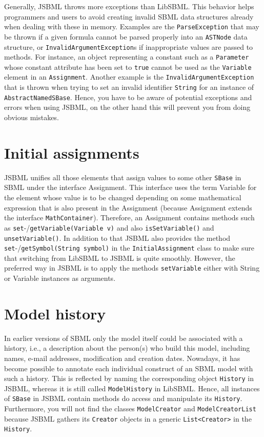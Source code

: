 \documentclass[
  BCOR12mm,
  letterpaper,
  11pt,
  headsepline,
  pointlessnumbers,
  tablecaptionabove,
  headinclude,
  appendixprefix,
  idxtotoc,
  bibtotoc,
  twoside,
  titlepage
]{scrartcl}
\begin{document}
Generally, JSBML throws more exceptions than LibSBML. This behavior helps
programmers and users to avoid creating invalid SBML data structures already
when dealing with these in memory. Examples are the \verb!ParseException! that
may be thrown if a given formula cannot be parsed properly into an
\verb!ASTNode! data structure, or \verb!InvalidArgumentException!s if
inappropriate values are passed to methods. For instance, an object representing
a constant such as a \verb!Parameter! whose constant attribute has been set to
\verb!true! cannot be used as the \verb!Variable! element in an
\verb!Assignment!. Another example is the \verb!InvalidArgumentException! that
is thrown when trying to set an invalid identifier \verb!String! for an instance
of \verb!AbstractNamedSBase!. Hence, you have to be aware of potential
exceptions and errors when using JSBML, on the other hand this will 
prevent you from doing obvious mistakes.


\section{Initial assignments}

JSBML unifies all those elements that assign values to some other 
\verb!SBase! in SBML under the interface Assignment. This interface uses
the term Variable for the element whose value is to be changed depending
on some mathematical expression that is also present in the Assignment
(because Assignment extends the interface \texttt{MathContainer}). Therefore,
an Assignment contains methods such as
\verb!set!-/\verb!getVariable(Variable v)! and also \verb!isSetVariable()! and
\verb!unsetVariable()!. In addition to that JSBML also provides the method \verb!set!-/\verb!getSymbol(String symbol)! in the \texttt{InitialAssignment}
class to make sure that switching from LibSBML to JSBML is quite smoothly.
However, the preferred way in JSBML is to apply the methods
\texttt{setVariable} either with String or Variable instances as arguments.

\section{Model history}

In earlier versions of SBML only the model itself could be associated with a
history, i.e., a description about the person(s) who build this model, including
names, e-mail addresses, modification and creation dates. Nowadays, it has
become possible to annotate each individual construct of an SBML model with such
a history. This is reflected by naming the corresponding object \verb!History!
in JSBML, whereas it is still called \verb!ModelHistory! in LibSBML. Hence, all
instances of \verb!SBase! in JSBML contain methods do access and manipulate its
\verb!History!. Furthermore, you will not find the classes \verb!ModelCreator!
and \verb!ModelCreatorList! because JSBML gathers its \verb!Creator! objects
in a generic \verb!List<Creator>! in the \verb!History!.
\end{document}
